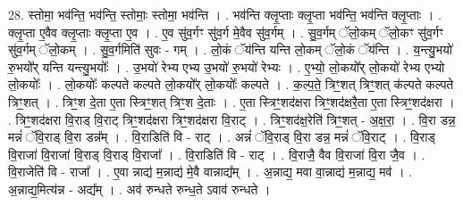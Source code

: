 \documentclass[17pt]{extarticle}
\begin{document}
28. स्तोमा॒ भव॑न्ति॒ भव॑न्ति॒ स्तोमाः॒ स्तोमा॒ भव॑न्ति । . भव॑न्ति क्लृ॒प्ताः क्लृ॒प्ता भव॑न्ति॒ भव॑न्ति क्लृ॒प्ताः । . क्लृ॒प्ता ए॒वैव क्लृ॒प्ताः क्लृ॒प्ता ए॒व । . ए॒व सु॑व॒र्गꣳ सु॑व॒र्ग मे॒वैव सु॑व॒र्गम् । . सु॒व॒र्गम् ॅलो॒कम् ॅलो॒कꣳ सु॑व॒र्गꣳ सु॑व॒र्गम् ॅलो॒कम् । . सु॒व॒र्गमिति॑ सुवः - गम् । . लो॒कं ॅय॑न्ति यन्ति लो॒कम् ॅलो॒कं ॅय॑न्ति । . य॒न्त्यु॒भयो॑ रु॒भयो᳚र् यन्ति यन्त्यु॒भयोः᳚ । . उ॒भयो॑ रेभ्य एभ्य उ॒भयो॑ रु॒भयो॑ रेभ्यः । . ए॒भ्यो॒ लो॒कयो᳚र् लो॒कयो॑ रेभ्य एभ्यो लो॒कयोः᳚ । . लो॒कयोः᳚ कल्पते कल्पते लो॒कयो᳚र् लो॒कयोः᳚ कल्पते । . क॒ल्प॒ते॒ त्रिꣳ॒॒शत् त्रिꣳ॒॒शत् क॑ल्पते कल्पते त्रिꣳ॒॒शत् । . त्रिꣳ॒॒श दे॒ता ए॒ता स्त्रिꣳ॒॒शत् त्रिꣳ॒॒श दे॒ताः । . ए॒ता स्त्रिꣳ॒॒शद॑क्षरा त्रिꣳ॒॒शद॑क्षरै॒ता ए॒ता स्त्रिꣳ॒॒शद॑क्षरा । . त्रिꣳ॒॒शद॑क्षरा वि॒राड् वि॒राट् त्रिꣳ॒॒शद॑क्षरा त्रिꣳ॒॒शद॑क्षरा वि॒राट् । . त्रिꣳ॒॒शद॑क्ष॒रेति॑ त्रिꣳ॒॒शत् - अ॒क्ष॒रा॒ । . वि॒रा डन्न॒ मन्नं॑ ॅवि॒राड् वि॒रा डन्न᳚म् । . वि॒राडिति॑ वि - राट् । . अन्नं॑ ॅवि॒राड् वि॒रा डन्न॒ मन्नं॑ ॅवि॒राट् । . वि॒राड् वि॒राजा॑ वि॒राजा॑ वि॒राड् वि॒राड् वि॒राजा᳚ । . वि॒राडिति॑ वि - राट् । . वि॒राजै॒ वैव वि॒राजा॑ वि॒रा जै॒व । . वि॒राजेति॑ वि - राजा᳚ । . ए॒वा न्नाद्य॑ म॒न्नाद्य॑ मे॒वै वान्नाद्य᳚म् । . अ॒न्नाद्य॒ मवा वा॒न्नाद्य॑ म॒न्नाद्य॒ मव॑ । . अ॒न्नाद्य॒मित्य॑न्न - अद्य᳚म् । . अव॑ रुन्धते रुन्ध॒ते ऽवाव॑ रुन्धते । \newline
\end{document}
